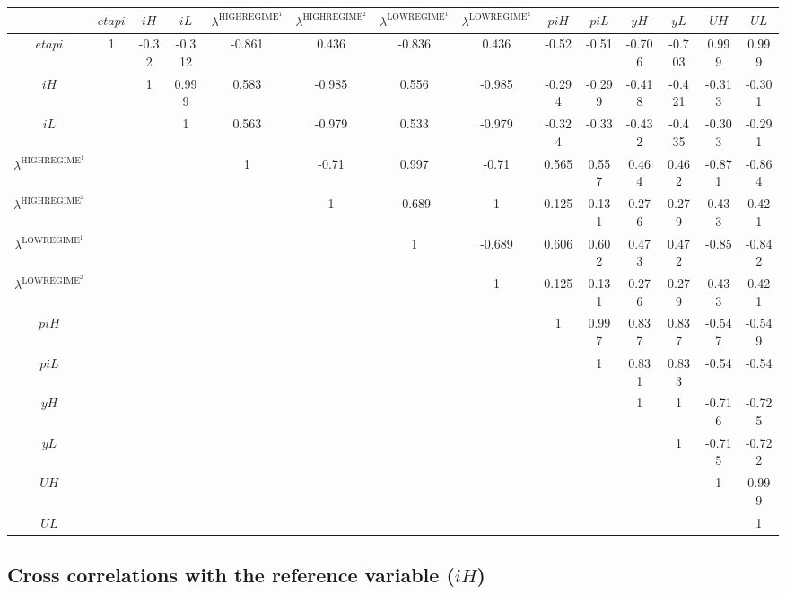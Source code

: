 \begin{tabular}{c|ccccccccccccc|}
  & ${e\!t\!a\!p\!i}$ & ${i\!H}$ & ${i\!L}$ & $\lambda^{\mathrm{HIGHREGIME}^{\mathrm{1}}}$ & $\lambda^{\mathrm{HIGHREGIME}^{\mathrm{2}}}$ & $\lambda^{\mathrm{LOWREGIME}^{\mathrm{1}}}$ & $\lambda^{\mathrm{LOWREGIME}^{\mathrm{2}}}$ & ${p\!i\!H}$ & ${p\!i\!L}$ & ${y\!H}$ & ${y\!L}$ & ${U\!H}$ & ${U\!L}$\\
\hline
${e\!t\!a\!p\!i}$ & 1 & -0.32 & -0.312 & -0.861 & 0.436 & -0.836 & 0.436 & -0.52 & -0.51 & -0.706 & -0.703 & 0.999 & 0.999 \\
${i\!H}$ &  & 1 & 0.999 & 0.583 & -0.985 & 0.556 & -0.985 & -0.294 & -0.299 & -0.418 & -0.421 & -0.313 & -0.301 \\
${i\!L}$ &  &  & 1 & 0.563 & -0.979 & 0.533 & -0.979 & -0.324 & -0.33 & -0.432 & -0.435 & -0.303 & -0.291 \\
$\lambda^{\mathrm{HIGHREGIME}^{\mathrm{1}}}$ &  &  &  & 1 & -0.71 & 0.997 & -0.71 & 0.565 & 0.557 & 0.464 & 0.462 & -0.871 & -0.864 \\
$\lambda^{\mathrm{HIGHREGIME}^{\mathrm{2}}}$ &  &  &  &  & 1 & -0.689 & 1 & 0.125 & 0.131 & 0.276 & 0.279 & 0.433 & 0.421 \\
$\lambda^{\mathrm{LOWREGIME}^{\mathrm{1}}}$ &  &  &  &  &  & 1 & -0.689 & 0.606 & 0.602 & 0.473 & 0.472 & -0.85 & -0.842 \\
$\lambda^{\mathrm{LOWREGIME}^{\mathrm{2}}}$ &  &  &  &  &  &  & 1 & 0.125 & 0.131 & 0.276 & 0.279 & 0.433 & 0.421 \\
${p\!i\!H}$ &  &  &  &  &  &  &  & 1 & 0.997 & 0.837 & 0.837 & -0.547 & -0.549 \\
${p\!i\!L}$ &  &  &  &  &  &  &  &  & 1 & 0.831 & 0.833 & -0.54 & -0.54 \\
${y\!H}$ &  &  &  &  &  &  &  &  &  & 1 & 1 & -0.716 & -0.725 \\
${y\!L}$ &  &  &  &  &  &  &  &  &  &  & 1 & -0.715 & -0.722 \\
${U\!H}$ &  &  &  &  &  &  &  &  &  &  &  & 1 & 0.999 \\
${U\!L}$ &  &  &  &  &  &  &  &  &  &  &  &  & 1 \\
\hline
\end{tabular}


\subsection{Cross correlations with the reference variable (${i\!H}$)}

